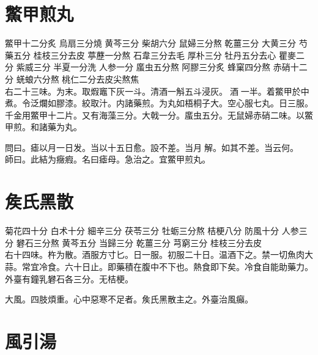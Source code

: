
\section{鱉甲煎丸}

鱉甲{\scriptsize 十二分炙} 烏扇{\scriptsize 三分燒} 黄芩{\scriptsize 三分} 柴胡{\scriptsize 六分} 鼠婦{\scriptsize 三分熬} 乾薑{\scriptsize 三分} 大黄{\scriptsize 三分} 芍藥{\scriptsize 五分} 桂枝{\scriptsize 三分去皮} 葶藶{\scriptsize 一分熬} 石韋{\scriptsize 三分去毛} 厚朴{\scriptsize 三分} 牡丹{\scriptsize 五分去心} 瞿麥{\scriptsize 二分} 紫威{\scriptsize 三分} 半夏{\scriptsize 一分洗} 人参{\scriptsize 一分} 䗪虫{\scriptsize 五分熬} 阿膠{\scriptsize 三分炙} 蜂窠{\scriptsize 四分熬} 赤硝{\scriptsize 十二分} 蜣蜋{\scriptsize 六分熬} 桃仁{\scriptsize 二分去皮尖熬焦}\\
右二十三味。为末。取煆竈下灰一斗。清酒一斛五斗浸灰。{\sungtpii 𠊱}酒{\sungtpii 𥁞}一半。着鱉甲於中煮。令泛爛如膠漆。絞取汁。内諸藥煎。为丸如梧桐子大。空心服七丸。日三服。{\scriptsize 千金用鱉甲十二片。又有海藻三分。大戟一分。䗪虫五分。无鼠婦赤硝二味。以鱉甲煎。和諸藥为丸。}

問曰。瘧以月一日发。当以十五日愈。設不差。当月{\sungtpii 𥁞}解。如其不差。当云何。\\
師曰。此結为癥瘕。名曰瘧母。急治之。宜鱉甲煎丸。

\section{矦氏黑散}

菊花{\scriptsize 四十分} 白术{\scriptsize 十分} 細辛{\scriptsize 三分} 茯苓{\scriptsize 三分} 牡蛎{\scriptsize 三分熬} 桔梗{\scriptsize 八分} 防風{\scriptsize 十分} 人参{\scriptsize 三分} 礬石{\scriptsize 三分熬} 黄芩{\scriptsize 五分} 当歸{\scriptsize 三分} 乾薑{\scriptsize 三分} 芎窮{\scriptsize 三分} 桂枝{\scriptsize 三分去皮}\\
右十四味。杵为散。酒服方寸匕。日一服。初服二十日。温酒下之。禁一切魚肉大蒜。常宜冷食。六十日止。即藥積在腹中不下也。熱食即下矣。冷食自能助藥力。{\scriptsize 外臺有鐘乳礬石各三分。无桔梗。}

大風。四肢煩重。心中惡寒不足者。矦氏黑散主之。{\scriptsize 外臺治風癲。}

\section{風引湯}

